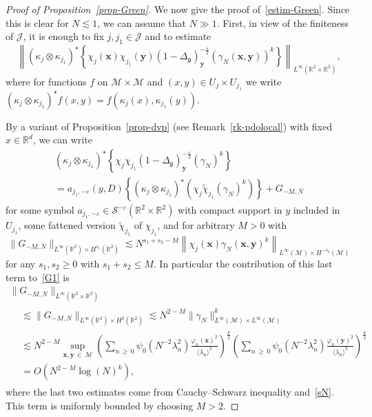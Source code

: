 \documentclass[10pt]{amsart}
\theoremstyle{definition}\newtheorem{defi}[theo]{Definition}\newtheorem{rema}[theo]{Remark}\newtheorem{exam}[theo]{Example}\newtheorem{exem}[theo]{Example}\newtheorem{nota}[theo]{Notation}
\newcommand{\R}{\mathbb{R}}
\newcommand{\x}{\mathbf{x}}
\newcommand{\y}{\mathbf{y}}
\renewcommand{\S}{\mathcal{S}}
\newcommand{\J}{\mathcal{J}}
\newcommand{\M}{\mathcal{M}}
\newcommand{\g}{\mathfrak{g}}
\newcommand{\ld}{\lambda}
\newcommand{\Dlg}{\Delta_{\g}}
\newcommand{\eps}{\varepsilon}
\newcommand{\kk}{\kappa}
\newcommand{\les}{\lesssim}
\newcommand{\jb}[1] {\langle #1 \rangle}
\begin{document}
\begin{proof}[Proof of Proposition~\ref{prop-Green}]
We now give the proof of~\eqref{estim-Green}. Since this is clear for $N\les 1$, we can assume that $N\gg 1$. First, in view of the finiteness of $\J$, it is enough to fix $j,j_1\in \J$ and to estimate
\begin{equation}\label{G1}
\left\|\left(\kk_{j}\otimes\kk_{j_1}\right)^{\star}\left\{\chi_{j}(\x)\chi_{j_1}(\y)(1-\Dlg)_{\y}^{-\frac\eps2}(\gamma_N(\x,\y))^k\right\}\right\|_{L^{\infty}\left(\R^2\times\R^2\right)},
\end{equation}
where for functions $f$ on $\M\times\M$ and $(x,y)\in U_j\times U_{j_1}$ we write $(\kk_{j}\otimes\kk_{j_1})^\star f(x,y) = f(\kk_j(x),\kk_{j_1}(y))$.

By a variant of Proposition~\ref{prop-dvp} (see Remark~\ref{rk-pdolocal}) with fixed $x\in\R^d$, we can write
\begin{multline*}
\left(\kk_{j}\otimes\kk_{j_1}\right)^{\star}\left\{\chi_{j}\chi_{j_1}(1-\Dlg)_{\y}^{-\frac\eps2}(\gamma_N)^k\right\}\\
= a_{j_1,-\eps}(y,D)
\left\{\left(\kk_{j}\otimes\kk_{j_1}\right)^{\star}\left(\chi_{j}\widetilde{\chi}_{j_1}(\gamma_N)^k\right)\right\} + G_{-M,N}
\end{multline*}
for some symbol $a_{j_1,-\eps}\in \S^{-\eps}(\R^2\times\R^2)$ with compact support in $y$ included in $U_{j_1}$, some fattened version $\widetilde{\chi}_{j_1}$ of $\chi_{j_1}$, and for arbitrary $M>0$ with
\begin{equation*}
\big\|G_{-M,N}\big\|_{L^{\infty}(\R^2)\times H^{s_1}(\R^2)} \les N^{s_1+s_2-M}\left\|\chi_j(\x)\gamma_N(\x,\y)^k\right\|_{L^{\infty}(\M)\times H^{-s_2}(\M)}
\end{equation*}
for any $s_1,s_2\ge 0$ with $s_1+s_2\le M$. In particular the contribution of this last term to~\eqref{G1} is
\begin{multline*}
\big\|G_{-M,N}\big\|_{L^{\infty}\left(\R^2\times\R^2\right)}\\
\begin{aligned}
&\les \big\|G_{-M,N}\big\|_{L^{\infty}(\R^2)\times H^2(\R^2)} \les N^{2-M}\big\|\gamma_N\big\|_{L^{\infty}(\M)\times L^{\infty}(\M)}^k\\
& \les N^{2-M}\sup_{\x,\y\,\in\,\M}\left(\sum_{n\,\ge\,0}\psi_0\left(N^{-2}\ld_n^2\right)\frac{\varphi_n(\x)^2}{\jb{\ld_n}^2}\right)^{\frac{k}2}\left(\sum_{n\,\ge\,0}\psi_0\left(N^{-2}\ld_n^2\right)\frac{\varphi_n(\y)^2}{\jb{\ld_n}^2}\right)^{\frac{k}2}\\
& = O\left(N^{2-M}\log(N)^k\right),
\end{aligned}
\end{multline*}
where the last two estimates come from Cauchy--Schwarz inequality and~\eqref{sN}. This term is uniformly bounded by choosing $M>2$.


\end{proof}
\end{document}
